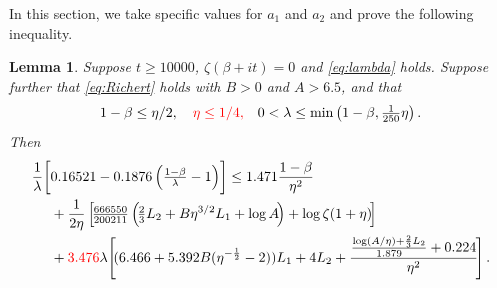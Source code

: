 \documentclass[10pt]{amsart}
\theoremstyle{remark}
\theoremstyle{plain}
\newtheorem{lemma}{Lemma}[section]
\numberwithin{equation}{section}
\theoremstyle{definition}
\def\({\left(}
\def\){\right)}
\def\lam{\lambda}
\newcommand{\rev}[1]{{\color{red}#1}}
\begin{document}
In this section, we take specific values for $a_1$ and $a_2$
and prove the following inequality.

\begin{lemma}\label{lem:zero inequality}
Suppose $t\ge 10000$, $\zeta(\beta+it)=0$ and \eqref{eq:lambda}
holds.  Suppose further that \eqref{eq:Richert} holds with $B>0$ and
$A>6.5$, and that
\begin{equation}
1-\beta \le  \eta/2, \rev{\quad \eta \le 1/4,} \quad 0 < \lam \le \min \( 1-\beta,
\tfrac1{250} \eta \). \label{eq:1-beta}
\end{equation}
Then
\begin{align*}
\frac{1}{\lam} \biggl[ &0.16521 - 0.1876\( \tfrac{1-\beta}{\lam}-1\)
  \biggr]  \le 1.471 \frac{1-\beta}{\eta^2} \\
&+ \frac{1}{2\eta} \left[ \!
  \tfrac{666550}{200211} \(\! \tfrac23 L_2 + B\eta^{3/2}L_1 +\log A \!\) 
  +\log\zeta(1+\eta)\! \right] \\
& + \rev{ 3.476} \lam \!\left[\! (6.466+5.392B(\eta^{-\frac12}-2))L_1 + 4L_2 +
   \frac{\tfrac{\log (A/\eta)+\frac23L_2}{1.879}+ 0.224}{\eta^2} \! \right].
\end{align*}
\end{lemma}
\end{document}

